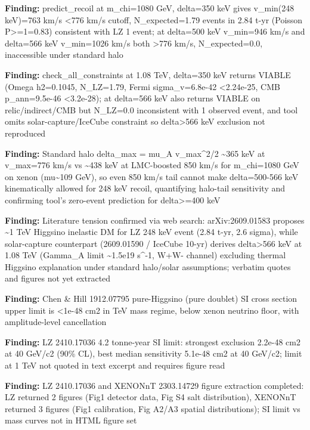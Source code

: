 \documentclass[11pt,a4paper]{article}
\begin{document}
\textbf{Finding:} predict\_recoil at m\_chi=1080 GeV, delta=350 keV gives v\_min(248 keV)=763 km/s \textless{}776 km/s cutoff, N\_expected=1.79 events in 2.84 t-yr (Poisson P\textgreater{}=1=0.83) consistent with LZ 1 event; at delta=500 keV v\_min=946 km/s and delta=566 keV v\_min=1026 km/s both \textgreater{}776 km/s, N\_expected=0.0, inaccessible under standard halo

\textbf{Finding:} check\_all\_constraints at 1.08 TeV, delta=350 keV returns VIABLE (Omega h2=0.1045, N\_LZ=1.79, Fermi sigma\_v=6.8e-42 \textless{}2.24e-25, CMB p\_ann=9.5e-46 \textless{}3.2e-28); at delta=566 keV also returns VIABLE on relic/indirect/CMB but N\_LZ=0.0 inconsistent with 1 observed event, and tool omits solar-capture/IceCube constraint so delta\textgreater{}566 keV exclusion not reproduced

\textbf{Finding:} Standard halo delta\_max = mu\_A v\_max\textasciicircum{}2/2 \textasciitilde{}365 keV at v\_max=776 km/s vs \textasciitilde{}438 keV at LMC-boosted 850 km/s for m\_chi=1080 GeV on xenon (mu\textasciitilde{}109 GeV), so even 850 km/s tail cannot make delta=500-566 keV kinematically allowed for 248 keV recoil, quantifying halo-tail sensitivity and confirming tool's zero-event prediction for delta\textgreater{}=400 keV

\textbf{Finding:} Literature tension confirmed via web search: arXiv:2609.01583 proposes \textasciitilde{}1 TeV Higgsino inelastic DM for LZ 248 keV event (2.84 t-yr, 2.6 sigma), while solar-capture counterpart (2609.01590 / IceCube 10-yr) derives delta\textgreater{}566 keV at 1.08 TeV (Gamma\_A limit \textasciitilde{}1.5e19 s\textasciicircum{}-1, W+W- channel) excluding thermal Higgsino explanation under standard halo/solar assumptions; verbatim quotes and figures not yet extracted

\textbf{Finding:} Chen \& Hill 1912.07795 pure-Higgsino (pure doublet) SI cross section upper limit is \textless{}1e-48 cm2 in TeV mass regime, below xenon neutrino floor, with amplitude-level cancellation

\textbf{Finding:} LZ 2410.17036 4.2 tonne-year SI limit: strongest exclusion 2.2e-48 cm2 at 40 GeV/c2 (90\% CL), best median sensitivity 5.1e-48 cm2 at 40 GeV/c2; limit at 1 TeV not quoted in text excerpt and requires figure read

\textbf{Finding:} LZ 2410.17036 and XENONnT 2303.14729 figure extraction completed: LZ returned 2 figures (Fig1 detector data, Fig S4 salt distribution), XENONnT returned 3 figures (Fig1 calibration, Fig A2/A3 spatial distributions); SI limit vs mass curves not in HTML figure set
\end{document}
